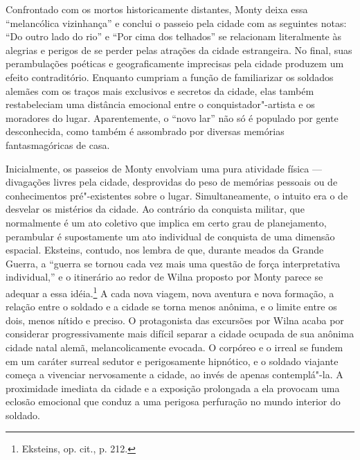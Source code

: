 %

Confrontado com os mortos historicamente distantes, Monty deixa essa
``melancólica vizinhança'' e conclui o passeio pela cidade com as
seguintes notas: ``Do outro lado do rio'' e ``Por cima dos telhados'' se
relacionam literalmente às alegrias e perigos de se perder pelas
atrações da cidade estrangeira. No final, suas perambulações poéticas e
geograficamente imprecisas pela cidade produzem um efeito contraditório.
Enquanto cumpriam a função de familiarizar os soldados alemães com os
traços mais exclusivos e secretos da cidade, elas também restabeleciam
uma distância emocional entre o conquistador"-artista e os moradores do
lugar. Aparentemente, o ``novo lar'' não só é populado por gente
desconhecida, como também é assombrado por diversas memórias
fantasmagóricas de casa.

Inicialmente, os passeios de Monty envolviam uma pura atividade física ---
divagações livres pela cidade, desprovidas do peso de memórias pessoais
ou de conhecimentos pré"-existentes sobre o lugar. Simultaneamente, o
intuito era o de desvelar os mistérios da cidade. Ao contrário da
conquista militar, que normalmente é um ato coletivo que implica em
certo grau de planejamento, perambular é supostamente um ato individual
de conquista de uma dimensão espacial. Eksteins, contudo, nos lembra de
que, durante meados da Grande Guerra, a ``guerra se tornou cada vez mais
uma questão de força interpretativa individual,'' e o itinerário ao
redor de Wilna proposto por Monty parece se adequar a essa
idéia.\footnote{Eksteins, op. cit., p. 212.} A cada nova viagem, nova
aventura e nova formação, a relação entre o soldado e a cidade se torna
menos anônima, e o limite entre os dois, menos nítido e preciso. O
protagonista das excursões por Wilna acaba por considerar
progressivamente mais difícil separar a cidade ocupada de sua anônima
cidade natal alemã, melancolicamente evocada. O corpóreo e o irreal se
fundem em um caráter surreal sedutor e perigosamente hipnótico, e o
soldado viajante começa a vivenciar nervosamente a cidade, ao invés de
apenas contemplá"-la. A proximidade imediata da cidade e a exposição
prolongada a ela provocam uma eclosão emocional que conduz a uma
perigosa perfuração no mundo interior do soldado.

